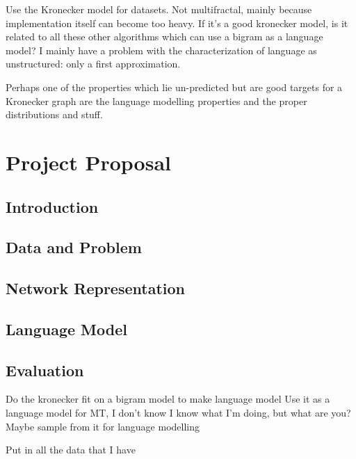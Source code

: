 \documentclass[12pt]{article}
\begin{document}
Use the Kronecker model for datasets. Not multifractal, mainly because implementation itself can become too heavy. If it's a good kronecker model, is it related to all these other algorithms which can use a bigram as a language model? I mainly have a problem with the characterization of language as unstructured: only a first approximation.

Perhaps one of the properties which lie un-predicted but are good targets for a Kronecker graph are the language modelling properties and the proper distributions and stuff.

\section{Project Proposal}

\subsection{Introduction}
\subsection{Data and Problem}
\subsection{Network Representation}
\subsection{Language Model}
\subsection{Evaluation}
Do the kronecker fit on a bigram model to make language model
Use it as a language model for MT, I don't know
I know what I'm doing, but what are you?
Maybe sample from it for language modelling

Put in all the data that I have

\end{document}
